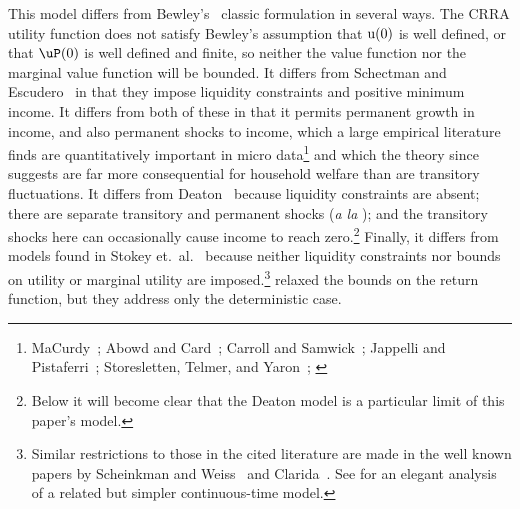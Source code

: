 \documentclass[titlepage]{\econtex}\providecommand{\texname}{BufferStockTheory}%
\begin{document}
\begin{comment}
Combining the transition equations, the recursive nature of
the problem allows us to rewrite it more compactly in Bellman equation form,
\begin{eqnarray*}
\VFunc_{t}(\mLevBF_{t},\pLevBF_{t}) & = & \max_{\cLevBF_{t}}~\left\{\util(\cLevBF_{t})+\DiscFac \Ex_{t}\left[ \VFunc_{t+1}((\mLevBF_{t}-\cLevBF_{t})\Rfree+ \pLevBF_{t+1}\tShkAll_{t+1},\pLevBF_{t} \PGro  \pShk_{t+1})\right]\right\}
.
\end{eqnarray*}
\end{comment}

\hypertarget{DiffWithLit}{} This model differs from Bewley's~\citeyearpar{bewleyPIH} classic formulation in several ways. The CRRA utility function does not satisfy Bewley's assumption that $\mathrm{u}(0)$ is well defined, or that $\uP(0)$ is well defined and finite, so neither the value function nor the marginal value function will be bounded.  It differs from Schectman and Escudero~\citeyearpar{seIncFluct} in that they impose liquidity constraints and positive minimum income.  It differs from both of these in that it permits permanent growth in income, and also permanent shocks to income, which a large empirical literature finds are quantitatively important in micro data\footnote{MaCurdy~\citeyearpar{macurdyTimeseries}; Abowd and Card~\citeyearpar{acCovariance}; Carroll and Samwick~\citeyearpar{csNature}; Jappelli and Pistaferri~\citeyearpar{jpCins}; Storesletten, Telmer, and Yaron~\citeyearpar{styConsumption}; \cite{blpRisk}} and which the theory since~\cite{friedmanATheory} suggests are far more consequential for household welfare than are transitory fluctuations.  It differs from Deaton~\citeyearpar{deatonLiqConstr} because liquidity constraints are absent; there are separate transitory and permanent shocks ({\it a la} \cite{muthOptimal}); and the transitory shocks here can occasionally cause income to reach zero.\footnote{Below it will become clear that the Deaton model is a particular limit of this paper's model.}  Finally, it differs from models found in Stokey et.\ al.~\citeyearpar{slpMethods} because neither liquidity constraints nor bounds on utility or marginal utility are imposed.\footnote{Similar restrictions to those in the cited literature are made in the well known papers by Scheinkman and Weiss~\citeyearpar{scheinkman&weiss:borrowing} and Clarida~\citeyearpar{claridaErgodic}.  See \cite{tocheUrisk} for an elegant analysis of a related but simpler continuous-time model.}  \cite{asHomogeneous} relaxed the bounds on the return function, but they address only the deterministic case.
\end{document}
